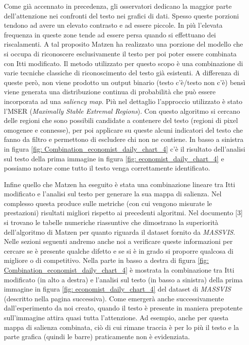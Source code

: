 \documentclass[%
	corpo=12pt,
    twoside,
    stile=classica,
    oldstyle,
    tipotesi=custom,
    greek,
    evenboxes,
]{toptesi}
\begin{document}
{Come già accennato in precedenza, gli osservatori dedicano la maggior parte dell'attenzione nei confronti del testo nei grafici di dati. Spesso queste porzioni tendono ad avere un elevato contrasto e ad essere piccole. In più l'elevata frequenza in queste zone tende ad essere persa quando si effettuano dei riscalamenti. A tal proposito Matzen ha realizzato una porzione del modello che si occupa di riconoscere esclusivamente il testo per poi poter essere combinata con Itti modificato. Il metodo utilizzato per questo scopo è una combinazione di varie tecniche classiche di riconoscimento del testo già esistenti. A differenza di queste però, non viene prodotto un output binario (testo c'è/testo non c'è) bensì viene generata una distribuzione continua di probabilità che può essere incorporata ad una \textit{saliency map}. Più nel dettaglio l'approccio utilizzato è stato l'MSER (\textit{Maximally Stable Extremal Regions}). Con questo algoritmo si cercano delle regioni che sono possibili candidate a contenere del testo (regioni di pixel omogenee e connesse), per poi applicare su queste alcuni indicatori del testo che fanno da filtro e permettono di escludere chi non ne contiene. In basso a sinistra in figura \ref{fig: Combination_economist_daily_chart_4} c'è il risultato dell'analisi sul testo della prima immagine in figura \ref{fig: economist_daily_chart_4} e possiamo notare come tutto il testo venga correttamente identificato.

Infine quello che Matzen ha eseguito è stata una combinazione lineare tra Itti modificato e l'analisi sul testo per generare la sua mappa di salienza. Nel complesso questa produce sulle metriche (con cui vengono misurate le prestazioni) risultati migliori rispetto ai precedenti algoritmi. Nel documento [3] si trovano le tabelle numeriche riassuntive che dimostrano la superiorità dell'algoritmo di Matzen per quanto riguarda il dataset fornito da \textit{MASSVIS}. Nelle sezioni seguenti andremo anche noi a verificare queste informazioni per cercare se è presente qualche difetto e se si è in grado si proporre qualcosa di migliore o di competitivo. Nella parte in basso a destra di figura \ref{fig: Combination_economist_daily_chart_4} è mostrata la combinazione tra Itti modificato (in alto a destra) e l'analisi sul testo (in basso a sinistra) della prima immagine in figura \ref{fig: economist_daily_chart_4} del dataset di \textit{MASSVIS} (descritto nella pagina successiva). Come emergerà anche successivamente dall'esperimento da noi creato, quando il testo è presente in maniera prepotente sull'immagine attira quasi tutta l'attenzione. Ad esempio, anche per questa mappa di salienza combinata, ciò di cui rimane traccia è per lo più il testo e la parte grafica (quindi le barre) praticamente non è evidenziata.



}
\end{document}
